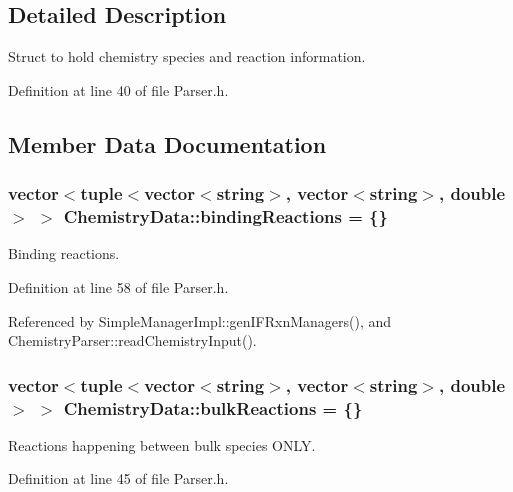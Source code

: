 \subsection{Detailed Description}
Struct to hold chemistry species and reaction information. 

Definition at line 40 of file Parser.\+h.



\subsection{Member Data Documentation}
\hypertarget{structChemistryData_aec9c915b7471596fa86d4c7ae2f0f8af}{
\subsubsection[{binding\+Reactions}]{\setlength{\rightskip}{0pt plus 5cm}vector$<$tuple$<$vector$<$string$>$, vector$<$string$>$, double$>$ $>$ Chemistry\+Data\+::binding\+Reactions = \{\}}}\label{structChemistryData_aec9c915b7471596fa86d4c7ae2f0f8af}


Binding reactions. 



Definition at line 58 of file Parser.\+h.



Referenced by Simple\+Manager\+Impl\+::gen\+I\+F\+Rxn\+Managers(), and Chemistry\+Parser\+::read\+Chemistry\+Input().

\hypertarget{structChemistryData_a18d2b4d3d417507768bb50f7f43f427b}{
\subsubsection[{bulk\+Reactions}]{\setlength{\rightskip}{0pt plus 5cm}vector$<$tuple$<$vector$<$string$>$, vector$<$string$>$, double$>$ $>$ Chemistry\+Data\+::bulk\+Reactions = \{\}}}\label{structChemistryData_a18d2b4d3d417507768bb50f7f43f427b}


Reactions happening between bulk species O\+N\+L\+Y. 



Definition at line 45 of file Parser.\+h.



